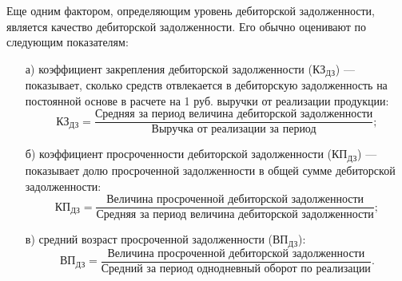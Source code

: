  Еще одним фактором, определяющим уровень дебиторской задолженности, является качество дебиторской задолженности.
 Его обычно оценивают по следующим показателям:
 \begin{enumerate}
 	\item [а)]коэффициент закрепления дебиторской задолженности ($ \text{КЗ}_\text{{ДЗ}} $) --- показывает, сколько средств отвлекается в дебиторскую задолженность на постоянной основе в расчете на 1 руб. выручки от реализации продукции:
 	\[ \text{КЗ}_\text{{ДЗ}} =  \dfrac{\text{Средняя за период величина дебиторской задолженности}}{\text{Выручка от реализации за период}};\]
 	\item [б)] коэффициент просроченности дебиторской задолженности ($ \text{КП}_\text{{ДЗ}} $) --- показывает долю просроченной задолженности в общей сумме дебиторской задолженности:
	 \[ \text{КП}_\text{{ДЗ}} =  \dfrac{\text{Величина просроченной дебиторской задолженности}}{\text{Средняя за период величина дебиторской задолженности}};\]
	 \item [в)] средний возраст просроченной задолженности ($ \text{ВП}_\text{{ДЗ}} $):
	 \[ \text{ВП}_\text{{ДЗ}} =  \dfrac{\text{Величина просроченной дебиторской задолженности}}{\text{Средний за период однодневный оборот по реализации}}.\]
 \end{enumerate}
 
 
 
 
 
 
 
 
 
 
 
 
 
 
 
 